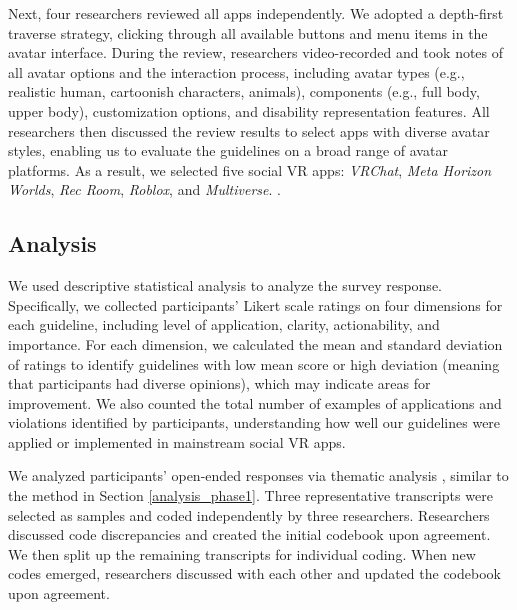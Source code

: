 Next, four researchers reviewed all apps independently. We adopted a depth-first traverse strategy, clicking through all available buttons and menu items in the avatar interface. During the review, researchers video-recorded and took notes of all avatar options and the interaction process, including avatar types (e.g., realistic human, cartoonish characters, animals), components (e.g., full body, upper body), customization options, and disability representation features. All researchers then discussed the review results to select apps with diverse avatar styles, enabling us to evaluate the guidelines on a broad range of avatar platforms.  
As a result, we selected five social VR apps: \textit{VRChat}, \textit{Meta Horizon Worlds}, \textit{Rec Room}, \textit{Roblox}, and \textit{Multiverse}. . 

\subsection{Analysis}
We used descriptive statistical analysis to analyze the survey response. Specifically, we collected participants' Likert scale ratings on four dimensions for each guideline, including level of application, clarity, actionability, and importance. For each dimension, we calculated the mean and standard deviation of ratings to identify guidelines with low mean score or high deviation (meaning that participants had diverse opinions), which may indicate areas for improvement. We also counted the total number of examples of applications and violations identified by participants, understanding how well our guidelines were applied or implemented in mainstream social VR apps. 

We analyzed participants' open-ended responses via thematic analysis \cite{Braun2006Thematic}, similar to the method in Section \ref{analysis_phase1}. Three representative transcripts were selected as samples and coded independently by three researchers. Researchers discussed code discrepancies and created the initial codebook upon agreement. We then split up the remaining transcripts for individual coding. When new codes emerged, researchers discussed with each other and updated the codebook upon agreement. 

